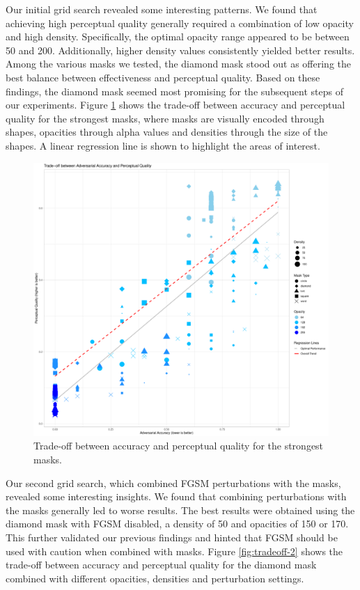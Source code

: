 \documentclass[a4paper, oneside]{discothesis}
\begin{document}
Our initial grid search revealed some interesting patterns. We found that achieving high perceptual quality generally required a combination of low opacity and high density. Specifically, the optimal opacity range appeared to be between 50 and 200. Additionally, higher density values consistently yielded better results. Among the various masks we tested, the diamond mask stood out as offering the best balance between effectiveness and perceptual quality. Based on these findings, the diamond mask seemed most promising for the subsequent steps of our experiments. Figure \ref{fig:tradeoff-1} shows the trade-off between accuracy and perceptual quality for the strongest masks, where masks are visually encoded through shapes, opacities through alpha values and densities through the size of the shapes. A linear regression line is shown to highlight the areas of interest.

\begin{figure}
	\centering
	\includegraphics[width=1\columnwidth]{figures/tradeoff-1.pdf}
	\caption{Trade-off between accuracy and perceptual quality for the strongest masks.}
	\label{fig:tradeoff-1}
\end{figure}

Our second grid search, which combined FGSM perturbations with the masks, revealed some interesting insights. We found that combining perturbations with the masks generally led to worse results. The best results were obtained using the diamond mask with FGSM disabled, a density of 50 and opacities of 150 or 170. This further validated our previous findings and hinted that FGSM should be used with caution when combined with masks. Figure \ref{fig:tradeoff-2} shows the trade-off between accuracy and perceptual quality for the diamond mask combined with different opacities, densities and perturbation settings.
\end{document}
